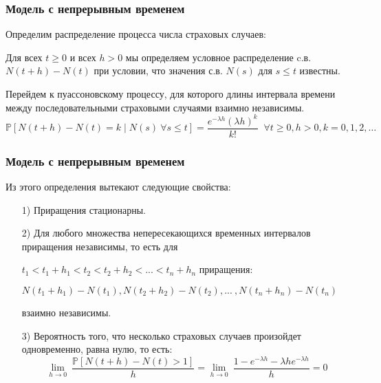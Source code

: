 \documentclass[10pt]{beamer}
\begin{document}
\begin{frame}
\frametitle{Модель с непрерывным временем} 
Определим распределение процесса числа страховых случаев: 
\par\medskip \noindent
Для всех $t\geq 0$ и всех $h>0$ мы определяем условное распределение c.в. $N(t + h) - N(t)$ при условии, что значения с.в. $N(s)$ для $s \leq t$ известны.
\par\medskip \noindent
Перейдем к пуассоновскому процессу, для которого длины интервала времени между последовательными страховыми случаями взаимно независимы.
\begin{equation*}
\mathbb{P}[N(t+h)-N(t)=k \mid N(s)\ \forall s \leq t] = \frac{e^{- \lambda h}(\lambda h)^{k}}{k!}
\;\; \forall t \geq 0, h > 0, k = 0, 1, 2, \dots
\end{equation*}
\end{frame}


\begin{frame}
\frametitle{Модель с непрерывным временем}
Из этого определения вытекают следующие свойства:
\begin{enumerate}
    \item[1)] Приращения стационарны.
    \item[2)] Для любого множества непересекающихся временных интервалов приращения независимы,
    то есть для
    \par\smallskip
    $t_{1}<t_{1}+h_{1}<t_{2}<t_{2}+h_{2}<...<t_{n}+h_{n}$
    приращения:
    \par\smallskip
    $N(t_{1}+h_{1})-N(t_{1}), N(t_{2}+h_{2})-N(t_{2}),...\:,N(t_{n}+h_{n})-N(t_{n})$
    \par\smallskip
    взаимно независимы.
    \item[3)] Вероятность того, что несколько страховых случаев произойдет одновременно, равна нулю,
    то есть:
    \begin{equation*}
        \lim_{h \rightarrow 0} \: \frac{\mathbb{P}[N(t+h)-N(t)>1]}{h} =
        \lim_{h \rightarrow 0} \: \frac{1-e^{- \lambda h}- \lambda he^{- \lambda h}}{h} = 0
    \end{equation*}
\end{enumerate}
\end{frame}
\end{document}
